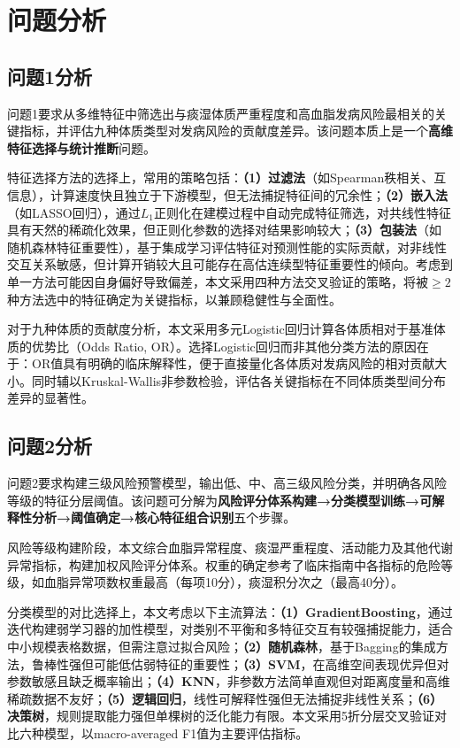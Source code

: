 \documentclass[12pt,a4paper]{ctexart}
\begin{document}
\section{问题分析}

\subsection{问题1分析}

问题1要求从多维特征中筛选出与痰湿体质严重程度和高血脂发病风险最相关的关键指标，并评估九种体质类型对发病风险的贡献度差异。该问题本质上是一个\textbf{高维特征选择与统计推断}问题。

特征选择方法的选择上，常用的策略包括：\textbf{（1）过滤法}（如Spearman秩相关、互信息），计算速度快且独立于下游模型，但无法捕捉特征间的冗余性；\textbf{（2）嵌入法}（如LASSO回归），通过$L_1$正则化在建模过程中自动完成特征筛选，对共线性特征具有天然的稀疏化效果，但正则化参数的选择对结果影响较大；\textbf{（3）包装法}（如随机森林特征重要性），基于集成学习评估特征对预测性能的实际贡献，对非线性交互关系敏感，但计算开销较大且可能存在高估连续型特征重要性的倾向。考虑到单一方法可能因自身偏好导致偏差，本文采用四种方法交叉验证的策略，将被$\geq 2$种方法选中的特征确定为关键指标，以兼顾稳健性与全面性。

对于九种体质的贡献度分析，本文采用多元Logistic回归计算各体质相对于基准体质的优势比（Odds Ratio, OR）。选择Logistic回归而非其他分类方法的原因在于：OR值具有明确的临床解释性，便于直接量化各体质对发病风险的相对贡献大小。同时辅以Kruskal-Wallis非参数检验，评估各关键指标在不同体质类型间分布差异的显著性。

\subsection{问题2分析}

问题2要求构建三级风险预警模型，输出低、中、高三级风险分类，并明确各风险等级的特征分层阈值。该问题可分解为\textbf{风险评分体系构建→分类模型训练→可解释性分析→阈值确定→核心特征组合识别}五个步骤。

风险等级构建阶段，本文综合血脂异常程度、痰湿严重程度、活动能力及其他代谢异常指标，构建加权风险评分体系。权重的确定参考了临床指南中各指标的危险等级，如血脂异常项数权重最高（每项10分），痰湿积分次之（最高40分）。

分类模型的对比选择上，本文考虑以下主流算法：\textbf{（1）GradientBoosting}，通过迭代构建弱学习器的加性模型，对类别不平衡和多特征交互有较强捕捉能力，适合中小规模表格数据，但需注意过拟合风险；\textbf{（2）随机森林}，基于Bagging的集成方法，鲁棒性强但可能低估弱特征的重要性；\textbf{（3）SVM}，在高维空间表现优异但对参数敏感且缺乏概率输出；\textbf{（4）KNN}，非参数方法简单直观但对距离度量和高维稀疏数据不友好；\textbf{（5）逻辑回归}，线性可解释性强但无法捕捉非线性关系；\textbf{（6）决策树}，规则提取能力强但单棵树的泛化能力有限。本文采用5折分层交叉验证对比六种模型，以macro-averaged F1值为主要评估指标。
\end{document}
